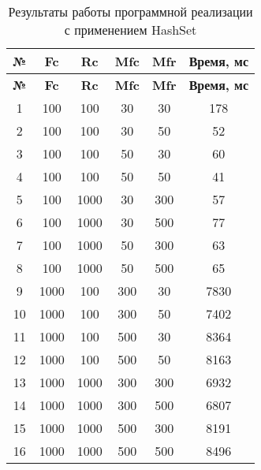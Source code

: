 \begin{longtable}{|c|c|c|c|c|c|}
    \caption{Результаты работы программной реализации с применением HashSet}
    \label{tab:hashset}\\   
    \hline
    \bfseries{№} & \bfseries{Fc} & \bfseries{Rc} & \bfseries{Mfc} & \bfseries{Mfr} & \bfseries{Время, мс} \\
    \hline
    \endfirsthead
    \hline
    \bfseries{№} & \bfseries{Fc} & \bfseries{Rc} & \bfseries{Mfc} & \bfseries{Mfr} & \bfseries{Время, мс} \\
    \hline
    \endhead
    \hline
    1 & 100 & 100 & 30 & 30 & 178 \\
    \hline
    2 & 100 & 100 & 30 & 50 & 52 \\
    \hline
    3 & 100 & 100 & 50 & 30 & 60 \\
    \hline
    4 & 100 & 100 & 50 & 50 & 41 \\
    \hline
    5 & 100 & 1000 & 30 & 300 & 57 \\
    \hline
    6 & 100 & 1000 & 30 & 500 & 77 \\
    \hline
    7 & 100 & 1000 & 50 & 300 & 63 \\
    \hline
    8 & 100 & 1000 & 50 & 500 & 65 \\
    \hline
    9 & 1000 & 100 & 300 & 30 & 7830 \\
    \hline
    10 & 1000 & 100 & 300 & 50 & 7402 \\
    \hline
    11 & 1000 & 100 & 500 & 30 & 8364 \\
    \hline
    12 & 1000 & 100 & 500 & 50 & 8163 \\
    \hline
    13 & 1000 & 1000 & 300 & 300 & 6932 \\
    \hline
    14 & 1000 & 1000 & 300 & 500 & 6807 \\
    \hline
    15 & 1000 & 1000 & 500 & 300 & 8191 \\
    \hline
    16 & 1000 & 1000 & 500 & 500 & 8496 \\
    \hline
\end{longtable}

